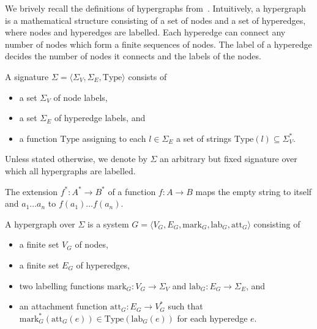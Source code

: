 We brively recall the definitions of hypergraphs from~\cite{plump2018modular}.
Intuitively, a hypergraph is a mathematical structure consisting of a set of nodes and a set of hyperedges, where nodes and hyperedges are labelled. Each hyperedge can connect any number of nodes which form a finite sequences of nodes. The label of a hyperedge decides the number of nodes it connects and the labels of the nodes.
\begin{definition}
    A signature $\Sigma \mathop{=} \langle \Sigma_V, \Sigma_E, \text{Type} \rangle$ consists of 
    \begin{itemize}
        \item a set $\Sigma_V$ of node labels,
        \item a set $\Sigma_E$ of hyperedge labels, and
        \item a function $\text{Type}$ assigning to each $l \mathop{\in} \Sigma_E$ a set of strings $\text{Type}(l) \mathop{\subseteq} \Sigma_V^*$.
    \end{itemize}
\end{definition}
Unless stated otherwise, we denote by $\Sigma$ an arbitrary but fixed signature over which all hypergraphs are labelled.
\begin{remark}
    The extension $f^* : A^* \mathop{\to} B^*$ of a function $f : A \mathop{\to} B$ maps the empty string to itself and $a_1 \ldots a_n$ to $f(a_1) \ldots f(a_n)$.
\end{remark}
\begin{definition}
    A hypergraph over $\Sigma$ is a system $G \mathop{=} \langle V_G, E_G, \text{mark}_G, \text{lab}_G, \text{att}_G \rangle$ consisting of 
    \begin{itemize}
        \item a finite set $V_G$ of nodes,
        \item a finite set $E_G$ of hyperedges,
        \item two labelling functions $\text{mark}_G : V_G \mathop{\to} \Sigma_V$ and $\text{lab}_G : E_G \mathop{\to} \Sigma_E$, and
        \item an attachment function $\text{att}_G : E_G \mathop{\to} V_G^*$ such that $\text{mark}_G^*(\text{att}_G(e)) \mathop{\in} \text{Type}(\text{lab}_G(e))$ for each hyperedge $e$.
    \end{itemize} 
\end{definition} 

